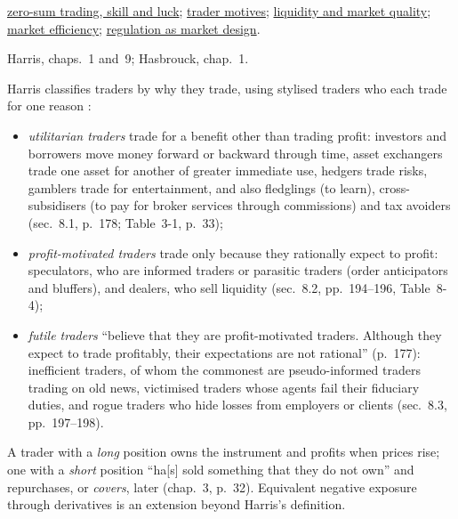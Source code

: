 \begin{qfdefinition}
 \hyperref[res:zero-sum-skill-luck]{zero-sum trading, skill and luck}; \hyperref[def:trader-motives]{trader motives}; \hyperref[def:liquidity-dimensions]{liquidity and market quality}; \hyperref[def:market-efficiency]{market efficiency}; \hyperref[def:market-regulation-design]{regulation as market design}.

 Harris, chaps.~1 and~9; Hasbrouck, chap.~1.

\end{qfdefinition}

\begin{qfdefinition}\label{def:trader-motives}
 Harris classifies traders by why they trade, using stylised traders who each trade for one reason \citep[chap.~8, p.~177]{alpha-harris}:
\begin{itemize}
\item \emph{utilitarian traders} trade for a benefit other than trading profit: investors and borrowers move money forward or backward through time, asset exchangers trade one asset for another of greater immediate use, hedgers trade risks, gamblers trade for entertainment, and also fledglings (to learn), cross-subsidisers (to pay for broker services through commissions) and tax avoiders (sec.~8.1, p.~178; Table~3-1, p.~33);
\item \emph{profit-motivated traders} trade only because they rationally expect to profit: speculators, who are informed traders or parasitic traders (order anticipators and bluffers), and dealers, who sell liquidity (sec.~8.2, pp.~194--196, Table~8-4);
\item \emph{futile traders} ``believe that they are profit-motivated traders. Although they expect to trade profitably, their expectations are not rational'' (p.~177): inefficient traders, of whom the commonest are pseudo-informed traders trading on old news, victimised traders whose agents fail their fiduciary duties, and rogue traders who hide losses from employers or clients (sec.~8.3, pp.~197--198).
\end{itemize}
A trader with a \emph{long} position owns the instrument and profits when prices rise; one with a \emph{short} position ``ha[s] sold something that they do not own'' and repurchases, or \emph{covers}, later (chap.~3, p.~32). Equivalent negative exposure through derivatives is an extension beyond Harris's definition.


\end{qfdefinition}
